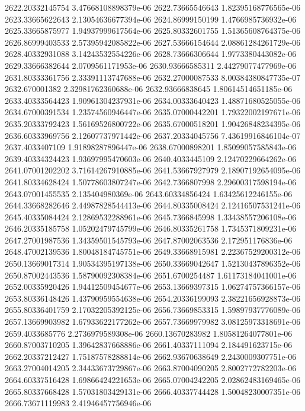 {2622.20332145754 3.47668108898379e-06
2622.73665546643 1.82395168776565e-06
2623.33665622643 2.13054636677394e-06
2624.86999150199 1.4766985736932e-06
2625.33665875977 1.94937999617564e-06
2625.80332601755 1.51365608764375e-06
2626.86999403533 2.57395942085822e-06
2627.53666154644 2.08861284261729e-06
2628.40332931088 3.14243532554226e-06
2628.73666306644 1.9773380443082e-06
2629.33666382644 2.0709561171953e-06
2630.93666585311 2.44279077477969e-06
2631.80333361756 2.33391113747688e-06
2632.27000087533 8.00384380847735e-07
2632.670001382 2.32981762360688e-06
2632.93666838645 1.80614514651185e-06
2633.40333564423 1.90961304237931e-06
2634.00333640423 1.48871680525055e-06
2634.67000391534 1.23574560946447e-06
2635.07000442201 1.79322002197671e-06
2635.20333792423 1.56169526800722e-06
2635.67000518201 1.90426848234395e-06
2636.60333969756 2.12607737971442e-06
2637.20334045756 7.43619916846104e-07
2637.4033407109 1.91898287896447e-06
2638.67000898201 1.85099057585843e-06
2639.40334324423 1.93697995470603e-06
2640.4033445109 2.12470229664262e-06
2641.07001202202 3.71614267910885e-06
2641.53667927979 2.18907192654095e-06
2641.80334628424 1.50778603807247e-06
2642.7366807998 2.29600317598194e-06
2643.07001455535 2.135404980369e-06
2643.60334856424 1.63425612246155e-06
2644.33668282646 2.44987828544413e-06
2644.80335008424 2.12416507531241e-06
2645.40335084424 2.12869532288961e-06
2645.7366845998 1.33438557206108e-06
2646.20335185758 1.05202479745799e-06
2646.80335261758 1.7345371809231e-06
2647.27001987536 1.34359501545793e-06
2647.87002063536 2.172951176836e-06
2648.47002139536 1.80048184745751e-06
2649.33668915981 2.22367529200312e-06
2650.13669017314 1.90534395197138e-06
2650.33669042647 1.52130437896352e-06
2650.87002443536 1.58790092308384e-06
2651.6700254487 1.61173184041001e-06
2652.00335920426 1.94412509454677e-06
2653.13669397315 1.06274757366157e-06
2653.80336148426 1.43790959554638e-06
2654.20336199093 2.38221656928873e-06
2655.80336401759 2.17032205392125e-06
2656.73669853315 1.59897937776089e-06
2657.13669903982 1.67933622177262e-06
2657.73669979982 3.08125973318691e-06
2659.4033685776 2.2736979589308e-06
2660.13670283982 1.80581264077801e-06
2660.87003710205 1.39642837668886e-06
2661.40337111094 2.184491623715e-06
2662.20337212427 1.75187578288814e-06
2662.93670638649 2.2430009307751e-06
2663.27004014205 2.34433673729867e-06
2663.87004090205 2.8002772782203e-06
2664.60337516428 1.69866424221653e-06
2665.07004242205 2.02862483169465e-06
2665.80337668428 1.57031803429131e-06
2666.40337744428 1.50048230007351e-06
2666.73671119983 2.41946457756946e-06
}

